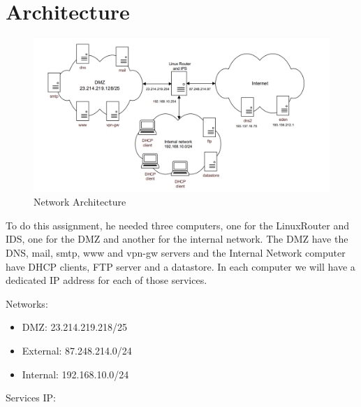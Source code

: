 \documentclass{article}
\begin{document}
\section{Architecture}

\begin{figure}[H]
    \centering
    \includegraphics[scale=0.5]{pics/architecture_sti2.png}
    \caption{Network Architecture}
    \label{fig:network-arc}
\end{figure}

\quad To do this assignment, he needed three computers, one for the LinuxRouter and IDS, one for the DMZ and another for the internal network. The DMZ have the DNS, mail, smtp, www and vpn-gw servers and the Internal Network computer have DHCP clients, FTP server and a datastore. In each computer we will have a dedicated IP address for each of those services.\par
\textbf{}
\par 
Networks:
\begin{itemize}
    \item DMZ: 23.214.219.218/25
    \item External: 87.248.214.0/24
    \item Internal: 192.168.10.0/24\par
\end{itemize}
\par
Services IP:
\end{document}
